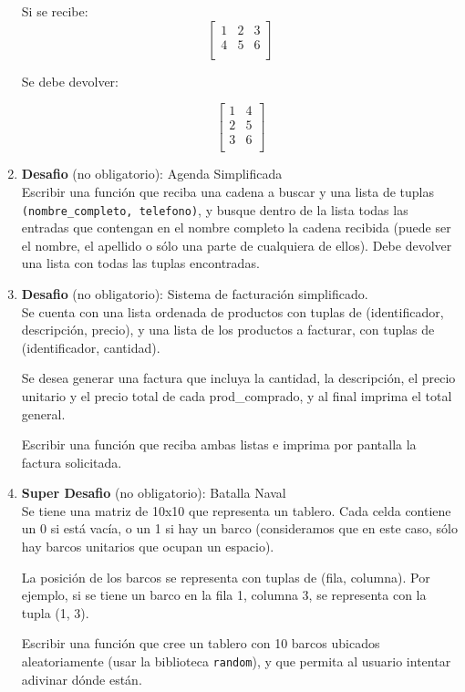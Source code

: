 \documentclass[
  letterpaper,
  DIV=11,
  numbers=noendperiod]{scrreprt}
\begin{document}
\begin{enumerate}
  Si se recibe: \[
  \begin{bmatrix}
  1 & 2 & 3  \\
  4 & 5 & 6  \\
  \end{bmatrix}
  \]

  Se debe devolver:

  \[
  \begin{bmatrix}
  1 & 4 \\
  2 & 5 \\
  3 & 6 \\
  \end{bmatrix}
  \]
\item
  \textbf{Desafio} (no obligatorio): Agenda Simplificada\\
  Escribir una función que reciba una cadena a buscar y una lista de
  tuplas \texttt{(nombre\_completo,\ telefono)}, y busque dentro de la
  lista todas las entradas que contengan en el nombre completo la cadena
  recibida (puede ser el nombre, el apellido o sólo una parte de
  cualquiera de ellos). Debe devolver una lista con todas las tuplas
  encontradas.
\item
  \textbf{Desafio} (no obligatorio): Sistema de facturación
  simplificado.\\
  Se cuenta con una lista ordenada de productos con tuplas de
  (identificador, descripción, precio), y una lista de los productos a
  facturar, con tuplas de (identificador, cantidad).

  Se desea generar una factura que incluya la cantidad, la descripción,
  el precio unitario y el precio total de cada prod\_comprado, y al
  final imprima el total general.

  Escribir una función que reciba ambas listas e imprima por pantalla la
  factura solicitada.
\item
  \textbf{Super Desafio} (no obligatorio): Batalla Naval\\

  Se tiene una matriz de 10x10 que representa un tablero. Cada celda
  contiene un 0 si está vacía, o un 1 si hay un barco (consideramos que
  en este caso, sólo hay barcos unitarios que ocupan un espacio).

  La posición de los barcos se representa con tuplas de (fila, columna).
  Por ejemplo, si se tiene un barco en la fila 1, columna 3, se
  representa con la tupla (1, 3).

  Escribir una función que cree un tablero con 10 barcos ubicados
  aleatoriamente (usar la biblioteca \texttt{random}), y que permita al
  usuario intentar adivinar dónde están.


\end{enumerate}
\end{document}
